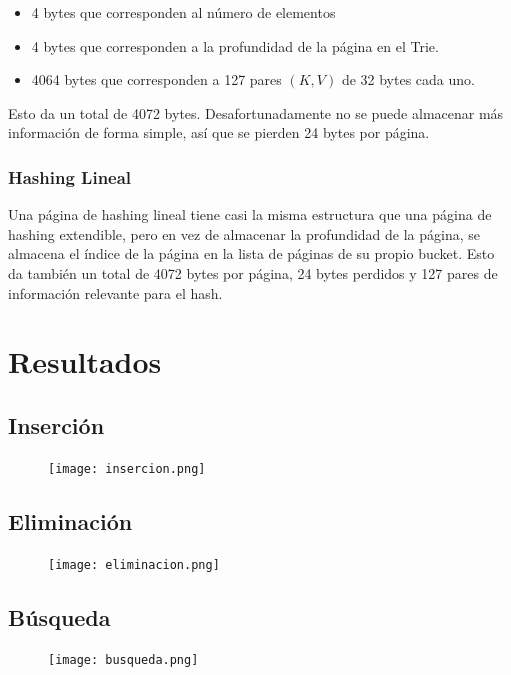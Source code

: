 \documentclass[12pt,letterpaper]{report}
\begin{document}
\begin{itemize}
\item 4 bytes que corresponden al número de elementos
\item 4 bytes que corresponden a la profundidad de la página en el Trie.
\item 4064 bytes que corresponden a 127 pares $(K,V)$ de 32 bytes cada uno.
\end{itemize}

Esto da un total de 4072 bytes. Desafortunadamente no se puede almacenar más información de forma simple, así que se pierden 24 bytes por página.

\subsubsection{Hashing Lineal}
Una página de hashing lineal tiene casi la misma estructura que una página de hashing extendible, pero en vez de almacenar la profundidad de la página, se almacena el índice de la página en la lista de páginas de su propio bucket. Esto da también un total de 4072 bytes por página, 24 bytes perdidos y 127 pares de información relevante para el hash.

\newpage
\section{Resultados}

\subsection{Inserción}
\begin{figure}[H]
\begin{center}
\texttt{[image: insercion.png]}
\end{center}
\end{figure}

\subsection{Eliminación}
\begin{figure}[H]
\begin{center}
\texttt{[image: eliminacion.png]}
\end{center}
\end{figure}

\subsection{Búsqueda}
\begin{figure}[H]
\begin{center}
\texttt{[image: busqueda.png]}
\end{center}
\end{figure}
\end{document}
